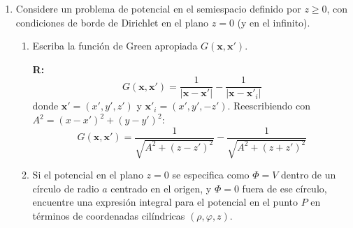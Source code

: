 \documentclass[]{article}
\numberwithin{equation}{section}
\newcommand{\0}{\textcolor{gray}{0}}
\newcommand{\la}{\nabla^2}
\newcommand{\xv}{\mathbf{x}}
\begin{document}
\begin{enumerate}
	\textbf{R:} El laplaciano en coordenadas esféricas:
	\begin{equation*}
		\la = \frac{1}{r^2 \sin (\theta )}\left[\frac{\partial }{\partial r}\left(r^2 \sin (\theta ) \frac{\partial }{\partial r}\right)+\frac{\partial }{\partial \varphi }\left(\frac{r}{r \sin (\theta )} \frac{\partial }{\partial \varphi } \right)+\frac{\partial }{\partial \theta }\left(\frac{ r \sin (\theta )}{r}\frac{\partial }{\partial \theta }\right)\right]
	\end{equation*}
	Y se cumple que
	\begin{equation*}
		\la\Phi = 0
	\end{equation*}
	
	\item Considere un problema de potencial en el semiespacio definido por \(z \geq 0\), con condiciones de borde de Dirichlet en el plano \(z = 0\) (y en el infinito).
	\begin{enumerate}
		\item Escriba la función de Green apropiada \(G(\xv, \xv')\).
		
		\textbf{R:}
		\begin{equation*}
			G(\xv,\xv') = \frac{1}{|\xv - \xv'|} - \frac{1}{|\xv - \xv'_{i}|}
		\end{equation*}
		donde \(\xv' = (x',y',z')\) y \(\xv'_i = (x',y',-z')\). Reescribiendo con \(A^2 = (x - x')^2 + (y - y')^2\):
		\begin{equation*}
			G(\xv,\xv') = \frac{1}{\sqrt{A^2 + (z - z')^2}} - \frac{1}{\sqrt{A^2 + (z + z')^2}}
		\end{equation*}
		
		\item Si el potencial en el plano \(z = 0\) se especifica como \(\Phi = V\) dentro de un círculo de radio \(a\) centrado en el origen, y \(\Phi = 0\) fuera de ese círculo, encuentre una expresión integral para el potencial en el punto \(P\) en términos de coordenadas cilíndricas \((\rho, \varphi, z)\).
		

\end{enumerate}
\end{enumerate}
\end{document}
